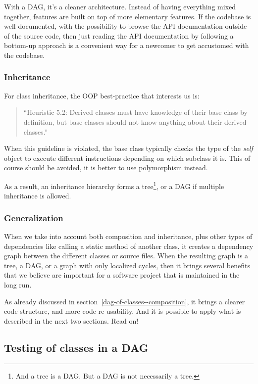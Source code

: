 \documentclass[a4paper,11pt]{article}
\begin{document}
With a DAG, it's a cleaner architecture. Instead of having everything mixed together, features are built on top of more elementary features. If the codebase is well documented, with the possibility to browse the API documentation outside of the source code, then just reading the API documentation by following a bottom-up approach is a convenient way for a newcomer to get accustomed with the codebase.

\subsubsection{Inheritance}

For class inheritance, the OOP best-practice that interests us is:
\begin{quotation}
  ``Heuristic 5.2: Derived classes must have knowledge of their base class by definition, but base classes should not know anything about their derived classes.''
\end{quotation}

When this guideline is violated, the base class typically checks the type of the \emph{self} object to execute different instructions depending on which subclass it is. This of course should be avoided, it is better to use polymorphism instead.

As a result, an inheritance hierarchy forms a tree\footnote{And a tree is a DAG. But a DAG is not necessarily a tree.}, or a DAG if multiple inheritance is allowed.

\subsubsection{Generalization}

When we take into account both composition and inheritance, plus other types of dependencies like calling a static method of another class, it creates a dependency graph between the different classes or source files. When the resulting graph is a tree, a DAG, or a graph with only localized cycles, then it brings several benefits that we believe are important for a software project that is maintained in the long run.

As already discussed in section~\ref{dag-of-classes--composition}, it brings a clearer code structure, and more code re-usability. And it is possible to apply what is described in the next two sections. Read on!

\subsection{Testing of classes in a DAG}
\label{dag-testing}
\end{document}
